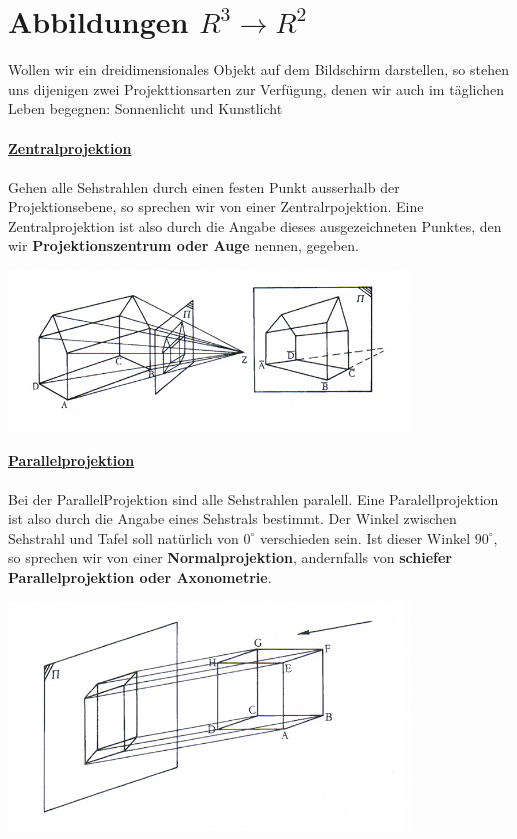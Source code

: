 \documentclass[a4paper,10pt]{report}
\begin{document}
\section{Abbildungen $R^3 \to R^2$}
Wollen wir ein dreidimensionales Objekt auf dem Bildschirm darstellen, so stehen uns dijenigen zwei Projekttionsarten zur Verfügung, denen wir auch im täglichen Leben begegnen:  Sonnenlicht und Kunstlicht\\
\\
\underline{\textbf{Zentralprojektion}}\\
\\
Gehen alle Sehstrahlen durch einen festen Punkt ausserhalb der Projektionsebene, so sprechen wir von einer Zentralrpojektion. Eine Zentralprojektion ist also durch die Angabe dieses ausgezeichneten Punktes, den wir \textbf{Projektionszentrum oder Auge} nennen, gegeben.
\begin{center}
	 \includegraphics[width=0.8\textwidth]{imgs/zentralprojektion.png}
 \end{center}
\underline{\textbf{Parallelprojektion}}\\
\\
Bei der ParallelProjektion sind alle Sehstrahlen paralell. Eine Paralellprojektion ist also durch die Angabe eines Sehstrals bestimmt. Der Winkel zwischen Sehstrahl und Tafel soll natürlich von $0^\circ$ verschieden sein. Ist dieser Winkel $90^\circ$, so sprechen wir von einer \textbf{Normalprojektion}, andernfalls von \textbf{schiefer Parallelprojektion oder Axonometrie}.
\begin{center}
	 \includegraphics[width=0.8\textwidth]{imgs/paralellprojektion.png}
 \end{center}
\end{document}
